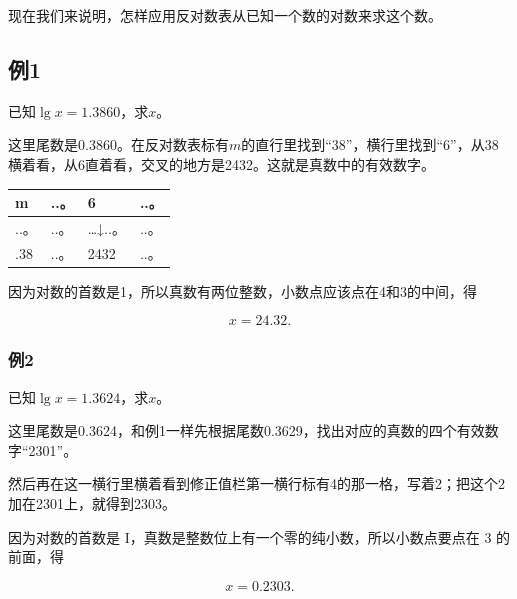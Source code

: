 现在我们来说明，怎样应用反对数表从已知一个数的对数来求这个数。

\subsection{例1}

已知\(\lg x = 1.3860\)，求\(x\)。

这里尾数是0.3860。在反对数表标有\(m\)的直行里找到``38''，横行里找到``6''，从38横着看，从6直着看，交叉的地方是2432。这就是真数中的有效数字。

{\def\LTcaptype{none} %
\begin{longtable}[]{@{}llll@{}}
\toprule\noalign{}
m & ..。 & 6 & ..。 \\
\midrule\noalign{}
\endhead
\bottomrule\noalign{}
\endlastfoot
..。 & ..。 & \ldots↓..。 & ..。 \\
.38 & ..。 & 2432 & ..。 \\
\end{longtable}
}

因为对数的首数是1，所以真数有两位整数，小数点应该点在4和3的中间，得

\[
x = 24.32.
\]

\subsubsection{例2}

已知\(\lg x = 1.3624\)，求\(x\)。

这里尾数是0.3624，和例1一样先根据尾数0.3629，找出对应的真数的四个有效数字``2301''。

{\centering
\small\setlength{\tabcolsep}{3pt}%
\par
}

然后再在这一横行里横着看到修正值栏第一横行标有4的那一格，写着2；把这个2加在2301上，就得到2303。

因为对数的首数是 I，真数是整数位上有一个零的纯小数，所以小数点要点在 3
的前面，得

\[
x = 0.2303.
\]

